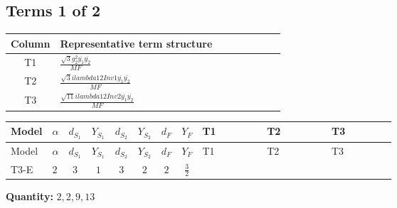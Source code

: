 \documentclass[8pt]{article}
\begin{document}
\begin{landscape}
\subsection*{Terms 1 of 2}
\begin{center}
\begin{tabular}{@{}c >{\raggedright\arraybackslash}p{0.82\linewidth}@{}}
\toprule
Column & Representative term structure \\
\midrule
T1 & \(\displaystyle \frac{\sqrt{3} g_{2}^{2} \overline{y_{1}} \overline{y_{2}}}{MF}\) \\
\midrule
T2 & \(\displaystyle \frac{\sqrt{3} i lambda12Inv1 \overline{y_{1}} \overline{y_{2}}}{MF}\) \\
\midrule
T3 & \(\displaystyle \frac{\sqrt{11} i lambda12Inv2 \overline{y_{1}} \overline{y_{2}}}{MF}\) \\
\midrule
\bottomrule
\end{tabular}
\end{center}
\smallskip
\tiny
\begin{longtable}{@{}llcccccc >{\raggedright\arraybackslash}p{0.21\linewidth} >{\raggedright\arraybackslash}p{0.21\linewidth} >{\raggedright\arraybackslash}p{0.21\linewidth}@{}}
\toprule
Model & $\alpha$ & $d_{S_1}$ & $Y_{S_1}$ & $d_{S_2}$ & $Y_{S_2}$ & $d_F$ & $Y_F$ & T1 & T2 & T3 \\
\midrule
\endfirsthead
\toprule
Model & $\alpha$ & $d_{S_1}$ & $Y_{S_1}$ & $d_{S_2}$ & $Y_{S_2}$ & $d_F$ & $Y_F$ & T1 & T2 & T3 \\
\midrule
\endhead
T3-E & $2$ & $3$ & $1$ & $3$ & $2$ & $2$ & $\frac{3}{2}$ & \scriptsize\adjustbox{max width=\linewidth}{$\begin{gathered} - \frac{\sqrt{3} g_{2}^{2} \overline{y_{1}} \overline{y_{2}}}{6 MF}\end{gathered}$} & \scriptsize\adjustbox{max width=\linewidth}{$\begin{gathered} - \frac{\sqrt{3} i lambda12Inv1 \overline{y_{1}} \overline{y_{2}}}{6 MF}\end{gathered}$} & \scriptsize\adjustbox{max width=\linewidth}{$\begin{gathered} \frac{3 \sqrt{11} i lambda12Inv2 \overline{y_{1}} \overline{y_{2}}}{22 MF}\end{gathered}$} \\
\midrule
\bottomrule
\end{longtable}
\clearpage
\noindent\textbf{Quantity: }$\mathrm{2,2,9,13}$\par\smallskip

\end{landscape}
\end{document}
